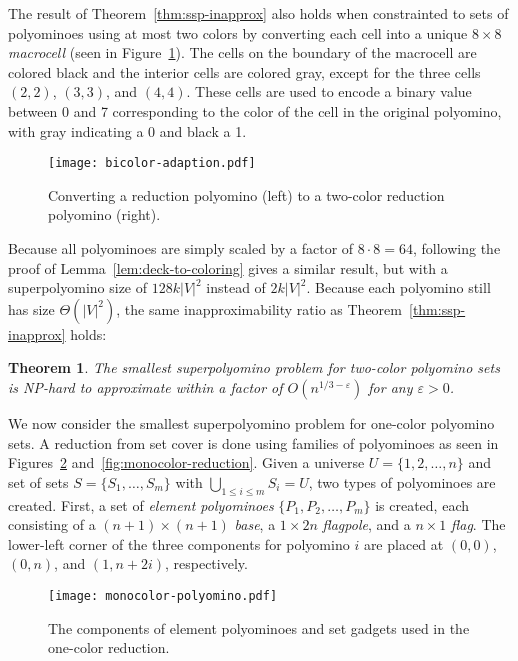 \documentclass{article}
\newtheorem{theorem}{Theorem}[section]
\newcommand{\ccNP}{\textrm{\textsc{NP}}}
\begin{document}
The result of Theorem~\ref{thm:ssp-inapprox} also holds when constrainted to sets of polyominoes using at most two colors by converting each cell into a unique $8 \times 8$ \emph{macrocell} (seen in Figure~\ref{fig:bicolor-adaption}).
The cells on the boundary of the macrocell are colored black and the interior cells are colored gray, except for the three cells $(2, 2)$, $(3, 3)$, and $(4, 4)$. 
These cells are used to encode a binary value between 0 and 7 corresponding to the color of the cell in the original polyomino, with gray indicating a 0 and black a 1.

\begin{figure}[ht]
\centering
\texttt{[image: bicolor-adaption.pdf]}
\caption{Converting a reduction polyomino (left) to a two-color reduction polyomino (right).}
\label{fig:bicolor-adaption}
\end{figure}

Because all polyominoes are simply scaled by a factor of $8 \cdot 8 = 64$, following the proof of Lemma~\ref{lem:deck-to-coloring} gives a similar result, but with a superpolyomino size of $128k|V|^2$ instead of $2k|V|^2$.
Because each polyomino still has size $\Theta(|V|^2)$, the same inapproximability ratio as Theorem~\ref{thm:ssp-inapprox} holds:

\begin{theorem}
The smallest superpolyomino problem for two-color polyomino sets is \ccNP-hard to approximate within a factor of $O(n^{1/3 - \varepsilon})$ for any $\varepsilon > 0$.
\end{theorem}

We now consider the smallest superpolyomino problem for one-color polyomino sets.
A reduction from set cover is done using families of polyominoes as seen in Figures~\ref{fig:monocolor-polyomino} and~\ref{fig:monocolor-reduction}.
Given a universe $U = \{1, 2, \dots, n\}$ and set of sets $S = \{S_1, \dots, S_m\}$ with $\bigcup_{1 \leq i \leq m}S_i = U$, two types of polyominoes are created.
First, a set of \emph{element polyominoes} $\{P_1, P_2, \dots, P_m\}$ is created, each consisting of a $(n+1) \times (n+1)$ \emph{base}, a $1 \times 2n$ \emph{flagpole}, and a $n \times 1$ \emph{flag}.
The lower-left corner of the three components for polyomino $i$ are placed at $(0, 0)$, $(0, n)$, and $(1, n + 2i)$, respectively. 

\begin{figure}[ht]
\centering
\texttt{[image: monocolor-polyomino.pdf]}
\caption{The components of element polyominoes and set gadgets used in the one-color reduction.}
\label{fig:monocolor-polyomino}
\end{figure}
\end{document}
